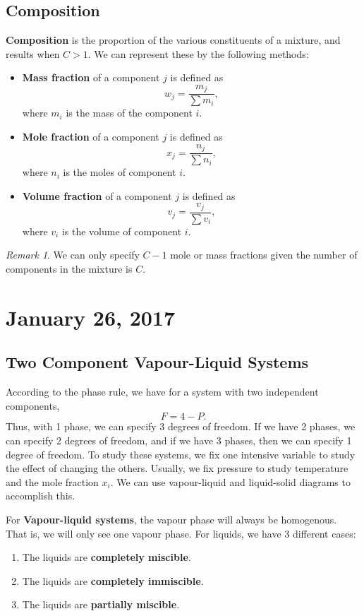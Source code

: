 \documentclass[11pt]{article}
\theoremstyle{plain} %
\theoremstyle{definition}
\theoremstyle{example}
\theoremstyle{remark}
\newtheorem*{remark}{Remark}
\begin{document}
\subsection{Composition}
\textbf{Composition} is the proportion of the various constituents of a mixture, and results when $C>1$. We can represent these by the following methods:
\begin{itemize}
	\item \textbf{Mass fraction} of a component $j$ is defined as 
	$$w_j = \frac{m_j}{\sum m_i},$$
	where $m_i$ is the mass of the component $i$.
	\item \textbf{Mole fraction} of a component $j$ is defined as 
	$$x_j = \frac{n_j}{\sum n_i},$$
	where $n_i$ is the moles of component $i$.
	\item \textbf{Volume fraction} of a component $j$ is defined as 
	$$v_j = \frac{v_j}{\sum v_i},$$
	where $v_i$ is the volume of component $i$.
\end{itemize}

\begin{remark}
We can only specify $C-1$ mole or mass fractions given the number of components in the mixture is $C$. 
\end{remark}

\section{January 26, 2017}

\subsection{Two Component Vapour-Liquid Systems}

According to the phase rule, we have for a system with two independent components, 
$$F = 4-P.$$
Thus, with 1 phase, we can specify 3 degrees of freedom. If we have 2 phases, we can specify 2 degrees of freedom, and if we have 3 phases, then we can specify 1 degree of freedom. To study these systems, we fix one intensive variable to study the effect of changing the others. Usually, we fix pressure to study temperature and the mole fraction $x_i$. We can use vapour-liquid and liquid-solid diagrams to accomplish this. 

For \textbf{Vapour-liquid systems}, the vapour phase will always be homogenous. That is, we will only see one vapour phase. For liquids, we have 3 different cases:
\begin{enumerate}
	\item The liquids are \textbf{completely miscible}. 
	\item The liquids are \textbf{completely immiscible}. 
	\item The liquids are \textbf{partially miscible}. 
\end{enumerate}
\end{document}
